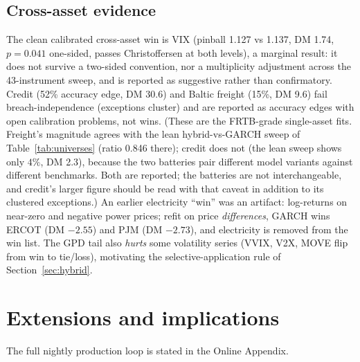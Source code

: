 \documentclass[11pt]{article}
\theoremstyle{remark}
\begin{document}
\subsection{Cross-asset evidence}

The clean calibrated cross-asset win is VIX (pinball 1.127 vs 1.137, DM
1.74, $p=0.041$ one-sided, passes Christoffersen at both levels), a
marginal result: it does not survive a two-sided convention, nor a
multiplicity adjustment across the 43-instrument sweep, and is reported
as suggestive rather than confirmatory. Credit (52\%
accuracy edge, DM 30.6) and Baltic freight (15\%, DM 9.6) fail
breach-independence (exceptions cluster) and are reported as
accuracy edges with open calibration problems, not wins. (These are the
FRTB-grade single-asset fits. Freight's magnitude agrees with the lean
hybrid-vs-GARCH sweep of Table~\ref{tab:universes} (ratio 0.846 there);
credit does not (the lean sweep shows only $4\%$, DM 2.3), because
the two batteries pair different model variants against different
benchmarks. Both are reported; the batteries are not interchangeable,
and credit's larger figure should be read with that caveat in addition
to its clustered exceptions.) An earlier
electricity ``win'' was an artifact: log-returns on near-zero and
negative power prices; refit on price \emph{differences}, GARCH wins
ERCOT (DM $-2.55$) and PJM (DM $-2.73$), and electricity is removed
from the win list. The GPD tail also \emph{hurts} some volatility
series (VVIX, V2X, MOVE flip from win to tie/loss), motivating the
selective-application rule of Section~\ref{sec:hybrid}.

\section{Extensions and implications}\label{sec:applications}

\noindent The full nightly production loop is stated in the Online Appendix.
\end{document}

